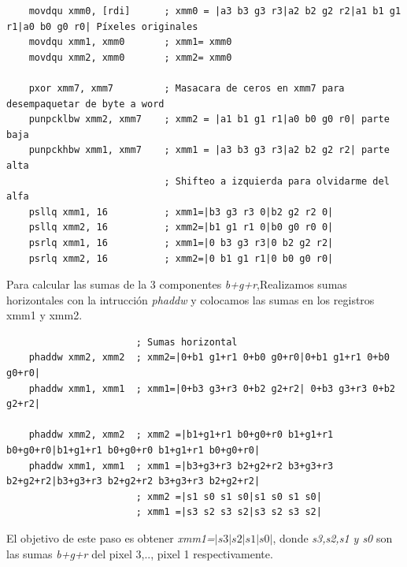 \begin{codesnippet}
\begin{verbatim}
    movdqu xmm0, [rdi]      ; xmm0 = |a3 b3 g3 r3|a2 b2 g2 r2|a1 b1 g1 r1|a0 b0 g0 r0| Píxeles originales
    movdqu xmm1, xmm0       ; xmm1= xmm0
    movdqu xmm2, xmm0       ; xmm2= xmm0

    pxor xmm7, xmm7         ; Masacara de ceros en xmm7 para desempaquetar de byte a word
    punpcklbw xmm2, xmm7    ; xmm2 = |a1 b1 g1 r1|a0 b0 g0 r0| parte baja
    punpckhbw xmm1, xmm7    ; xmm1 = |a3 b3 g3 r3|a2 b2 g2 r2| parte alta
                            ; Shifteo a izquierda para olvidarme del alfa
    psllq xmm1, 16          ; xmm1=|b3 g3 r3 0|b2 g2 r2 0|
    psllq xmm2, 16          ; xmm2=|b1 g1 r1 0|b0 g0 r0 0|
    psrlq xmm1, 16          ; xmm1=|0 b3 g3 r3|0 b2 g2 r2|
    psrlq xmm2, 16          ; xmm2=|0 b1 g1 r1|0 b0 g0 r0|
\end{verbatim}
\end{codesnippet}
Para calcular las sumas de la 3 componentes \emph{b+g+r},Realizamos sumas horizontales con la intrucción \emph{phaddw} y colocamos las sumas en los registros xmm1 y xmm2.
\begin{codesnippet}
\begin{verbatim}
                       ; Sumas horizontal
    phaddw xmm2, xmm2  ; xmm2=|0+b1 g1+r1 0+b0 g0+r0|0+b1 g1+r1 0+b0 g0+r0|
    phaddw xmm1, xmm1  ; xmm1=|0+b3 g3+r3 0+b2 g2+r2| 0+b3 g3+r3 0+b2 g2+r2|

    phaddw xmm2, xmm2  ; xmm2 =|b1+g1+r1 b0+g0+r0 b1+g1+r1 b0+g0+r0|b1+g1+r1 b0+g0+r0 b1+g1+r1 b0+g0+r0|
    phaddw xmm1, xmm1  ; xmm1 =|b3+g3+r3 b2+g2+r2 b3+g3+r3 b2+g2+r2|b3+g3+r3 b2+g2+r2 b3+g3+r3 b2+g2+r2|
                       ; xmm2 =|s1 s0 s1 s0|s1 s0 s1 s0|
                       ; xmm1 =|s3 s2 s3 s2|s3 s2 s3 s2|
\end{verbatim}
\end{codesnippet}

El objetivo de este paso es obtener \emph{xmm1=$|s3|s2|s1|s0|$}, donde \emph{s3,s2,s1 y s0} son las sumas \emph{b+g+r} del pixel 3,.., pixel 1 respectivamente.

